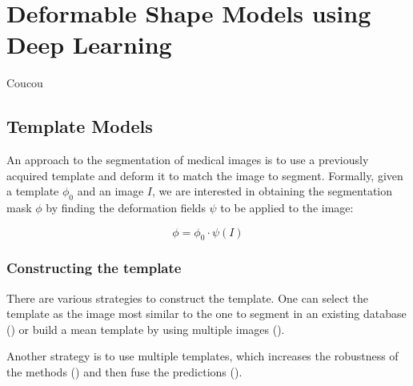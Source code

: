 \chapter{Deformable Shape Models using Deep Learning}
\label{chap:seg}

\begin{chapabstract}
 Coucou
\end{chapabstract}

\vspace{1cm}

{   
    \minitoc
}

\newpage

\section{Template Models}

An approach to the segmentation of medical images is to use a previously acquired template and deform it to match the image to segment. Formally, given a template $\phi_0$ and an image $I$, we are interested in obtaining the segmentation mask $\phi$ by finding the deformation fields $\psi$ to be applied to the image:

\begin{equation}
    \phi = \phi_0 \cdot \psi \left( I \right)
\end{equation}

\subsection{Constructing the template}

There are various strategies to construct the template. One can select the template as the image most similar to the one to segment in an existing database (\textcite{commowick2007MICCAI}) or build a mean template by using multiple images (\textcite{joshi2004}).

Another strategy is to use multiple templates, which increases the robustness of the methods (\textcite{heckemann2006}) and then fuse the predictions (\textcite{warfield2004}). 

